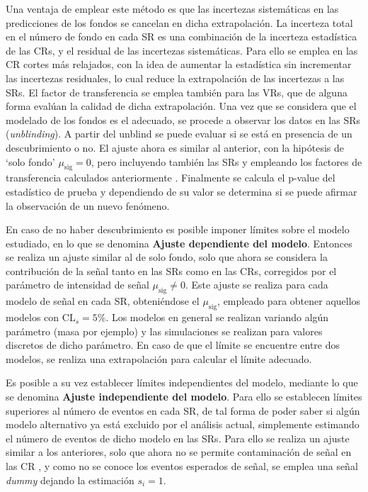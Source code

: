 Una ventaja de emplear este método es que las incertezas sistemáticas en las predicciones de los fondos se cancelan en dicha extrapolación. La incerteza total en el número de fondo en cada SR es una combinación de la incerteza estadística de las CRs, y el residual de las incertezas sistemáticas. Para ello se emplea en las CR cortes más relajados, con la idea de aumentar la estadística sin incrementar las incertezas residuales, lo cual reduce la extrapolación de las incertezas a las SRs. El factor de transferencia se emplea también para las VRs, que de alguna forma evalúan la calidad de dicha extrapolación. Una vez que se considera que el modelado de los fondos es el adecuado, se procede a observar los datos en las SRs (\textit{unblinding}). A partir del unblind se puede evaluar si se está en presencia de un descubrimiento o no. El ajuste ahora es similar al anterior, con la hipótesis de `solo fondo' $\mu_\text{sig}=0$, pero incluyendo también las SRs y empleando los factores de transferencia calculados anteriormente . Finalmente se calcula el p-value del estadístico de prueba y dependiendo de su valor se determina si se puede afirmar la observación de un nuevo fenómeno.

En caso de no haber descubrimiento es posible imponer límites sobre el modelo estudiado, en lo que se denomina \textbf{Ajuste dependiente del modelo}. Entonces se realiza un ajuste similar al de solo fondo, solo que ahora se considera la contribución de la señal tanto en las SRs como en las CRs, corregidos por el parámetro de intensidad de señal $\mu_\text{sig}\ne0$. Este ajuste se realiza para cada modelo de señal en cada SR, obteniéndose el $\mu_\text{sig}$, empleado para obtener aquellos modelos con $\text{CL}_{s}=5\%$. Los modelos en general se realizan variando algún parámetro (masa por ejemplo) y las simulaciones se realizan para valores discretos de dicho parámetro. En caso de que el límite se encuentre entre dos modelos, se realiza una extrapolación para calcular el límite adecuado.

Es posible a su vez establecer límites independientes del modelo, mediante lo que se denomina \textbf{Ajuste independiente del modelo}. Para ello se establecen límites superiores al número de eventos en cada SR, de tal forma de poder saber si algún modelo alternativo ya está excluido por el análisis actual, simplemente estimando el número de eventos de dicho modelo en las SRs. Para ello se realiza un ajuste similar a los anteriores, solo que ahora no se permite contaminación de señal en las CR , y como no se conoce los eventos esperados de señal, se emplea una señal \textit{dummy} dejando la estimación $s_i=1$.  



